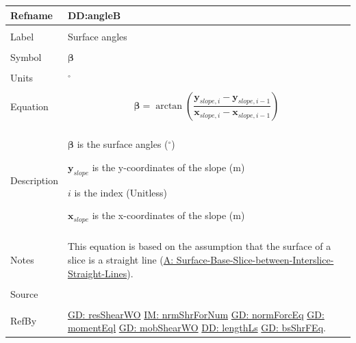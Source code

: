 \documentclass[12pt]{article}
\begin{document}
\noindent \begin{minipage}{\textwidth}
\begin{tabular}{p{} p{}}
\toprule \textbf{Refname} & \textbf{DD:angleB}
\label{DD:angleB}
\\ \midrule \\
Label & Surface angles
\\ \midrule \\
Symbol & $\mathbf{β}$
\\ \midrule \\
Units & ${}^{\circ}$
\\ \midrule \\
Equation & \begin{displaymath}
           \mathbf{β}=\arctan\left(\frac{{\mathbf{y}_{slope,i}}-{\mathbf{y}_{slope,i-1}}}{{\mathbf{x}_{slope,i}}-{\mathbf{x}_{slope,i-1}}}\right)
           \end{displaymath}
\\ \midrule \\
Description & \begin{symbDescription}
              \item{$\mathbf{β}$ is the surface angles (${}^{\circ}$)}
              \item{${\mathbf{y}_{slope}}$ is the y-coordinates of the slope (m)}
              \item{$i$ is the index (Unitless)}
              \item{${\mathbf{x}_{slope}}$ is the x-coordinates of the slope (m)}
              \end{symbDescription}
\\ \midrule \\
Notes & This equation is based on the assumption that the surface of a slice is a straight line (\hyperref[assumpSBSBISL]{A: Surface-Base-Slice-between-Interslice-Straight-Lines}).
\\ \midrule \\
Source & \cite{fredlund1977}
\\ \midrule \\
RefBy & \hyperref[GD:resShearWO]{GD: resShearWO} \hyperref[IM:nrmShrForNum]{IM: nrmShrForNum} \hyperref[GD:normForcEq]{GD: normForcEq} \hyperref[GD:momentEql]{GD: momentEql} \hyperref[GD:mobShearWO]{GD: mobShearWO} \hyperref[DD:lengthLs]{DD: lengthLs} \hyperref[GD:bsShrFEq]{GD: bsShrFEq}.
\\ \bottomrule \end{tabular}
\end{minipage}
\par~
\end{document}

